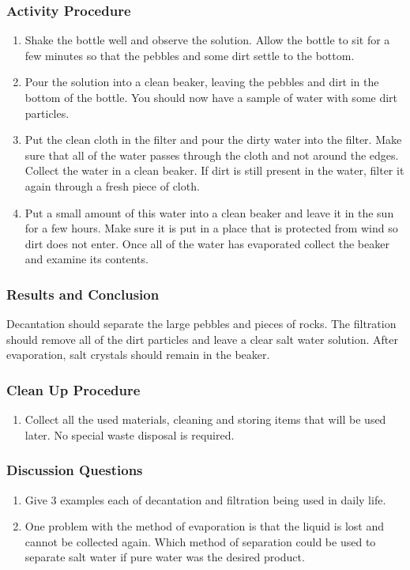 \subsubsection*{Activity Procedure}
\begin{enumerate}
\item Shake the bottle well and observe the solution. Allow the bottle to sit for a few minutes so that the pebbles and some dirt settle to the bottom.
\item Pour the solution into a clean beaker, leaving the pebbles and dirt in the bottom of the bottle. You should now have a sample of water with some dirt particles.
\item Put the clean cloth in the filter and pour the dirty water into the filter. Make sure that all of the water passes through the cloth and not around the edges. Collect the water in a clean beaker. If dirt is still present in the water, filter it again through a fresh piece of cloth.
\item Put a small amount of this water into a clean beaker and leave it in the sun for a few hours. Make sure it is put in a place that is protected from wind so dirt does not enter. Once all of the water has evaporated collect the beaker and examine its contents.
\end{enumerate}

\subsubsection*{Results and Conclusion}
Decantation should separate the large pebbles and pieces of rocks. The filtration should remove all of the dirt particles and leave a clear salt water solution. After evaporation, salt crystals should remain in the beaker.

\subsubsection*{Clean Up Procedure}
\begin{enumerate}
\item{Collect all the used materials, cleaning and storing items that will be used later. No special waste disposal is required.}
\end{enumerate}

\subsubsection*{Discussion Questions}
\begin{enumerate}
\item{Give 3 examples each of decantation and filtration being used in daily life.}
\item{One problem with the method of evaporation is that the liquid is lost and cannot be collected again. Which method of separation could be used to separate salt water if pure water was the desired product.}
\end{enumerate}


